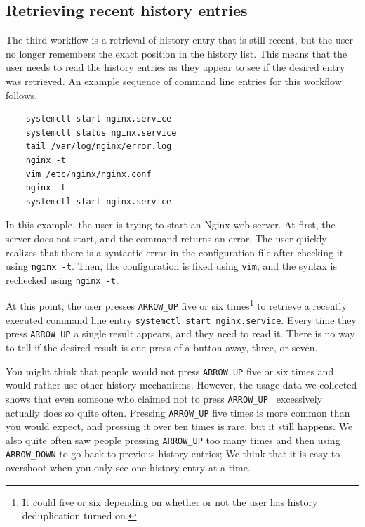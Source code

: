 \subsection{Retrieving recent history entries}\label{workflow-recent-history-arrow-up}
The third workflow is a retrieval of history entry that is still recent, but the user no longer remembers the exact position in the history list. This means that the user needs to read the history entries as they appear to see if the desired entry was retrieved. An example sequence of command line entries for this workflow follows.

\begin{verbatim}
    systemctl start nginx.service
    systemctl status nginx.service
    tail /var/log/nginx/error.log
    nginx -t
    vim /etc/nginx/nginx.conf
    nginx -t
    systemctl start nginx.service
\end{verbatim}

In this example, the user is trying to start an Nginx \cite{reese2008nginx} web server. At first, the server does not start, and the command returns an error. The user quickly realizes that there is a syntactic error in the configuration file after checking it using \verb|nginx -t|. Then, the configuration is fixed using \verb|vim|, and the syntax is rechecked using \verb|nginx -t|. 

At this point, the user presses \verb|ARROW_UP| five or six times\footnote{It could five or six depending on whether or not the user has history deduplication turned on.} to retrieve a recently executed command line entry \verb|systemctl start nginx.service|. Every time they press \verb|ARROW_UP| a single result appears, and they need to read it. There is no way to tell if the desired result is one press of a button away, three, or seven. %



You might think that people would not press \verb|ARROW_UP| five or six times and would rather use other history mechanisms.
However, the usage data we collected shows that even someone who claimed not to press \verb|ARROW_UP | excessively actually does so quite often. Pressing \verb|ARROW_UP| five times is more common than you would expect, and pressing it over ten times is rare, but it still happens. We also quite often saw people pressing \verb|ARROW_UP| too many times and then using \verb|ARROW_DOWN| to go back to previous history entries; We think that it is easy to overshoot when you only see one history entry at a time.


